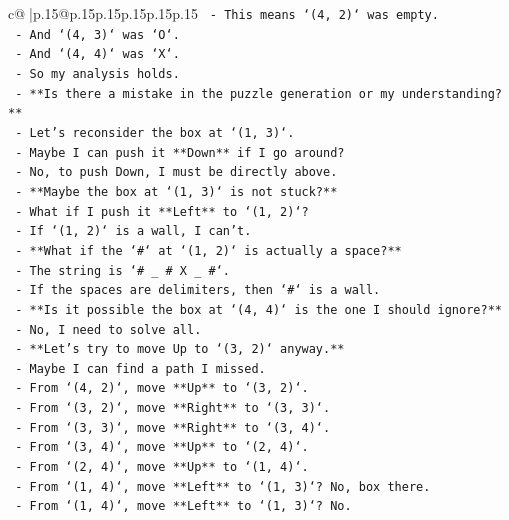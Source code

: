 \documentclass{article}
\begin{document}
{\begin{supertabular}{c@{$\;$}|p{.15\linewidth}@{}p{.15\linewidth}p{.15\linewidth}p{.15\linewidth}p{.15\linewidth}p{.15\linewidth}}
{{{\texttt{            {-} This means `(4, 2)` was empty.} \\
\texttt{            {-} And `(4, 3)` was `O`.} \\
\texttt{            {-} And `(4, 4)` was `X`.} \\
\texttt{            {-} So my analysis holds.} \\
\texttt{          {-} **Is there a mistake in the puzzle generation or my understanding?**} \\
\texttt{          {-} Let's reconsider the box at `(1, 3)`.} \\
\texttt{          {-} Maybe I can push it **Down** if I go around?} \\
\texttt{          {-} No, to push Down, I must be directly above.} \\
\texttt{          {-} **Maybe the box at `(1, 3)` is not stuck?**} \\
\texttt{          {-} What if I push it **Left** to `(1, 2)`?} \\
\texttt{          {-} If `(1, 2)` is a wall, I can't.} \\
\texttt{          {-} **What if the `\#` at `(1, 2)` is actually a space?**} \\
\texttt{          {-} The string is `\# \_ \# X \_ \#`.} \\
\texttt{          {-} If the spaces are delimiters, then `\#` is a wall.} \\
\texttt{          {-} **Is it possible the box at `(4, 4)` is the one I should ignore?**} \\
\texttt{          {-} No, I need to solve all.} \\
\texttt{          {-} **Let's try to move Up to `(3, 2)` anyway.**} \\
\texttt{          {-} Maybe I can find a path I missed.} \\
\texttt{          {-} From `(4, 2)`, move **Up** to `(3, 2)`.} \\
\texttt{          {-} From `(3, 2)`, move **Right** to `(3, 3)`.} \\
\texttt{          {-} From `(3, 3)`, move **Right** to `(3, 4)`.} \\
\texttt{          {-} From `(3, 4)`, move **Up** to `(2, 4)`.} \\
\texttt{          {-} From `(2, 4)`, move **Up** to `(1, 4)`.} \\
\texttt{          {-} From `(1, 4)`, move **Left** to `(1, 3)`? No, box there.} \\
\texttt{          {-} From `(1, 4)`, move **Left** to `(1, 3)`? No.} \\
}}}
\end{supertabular}}
\end{document}
